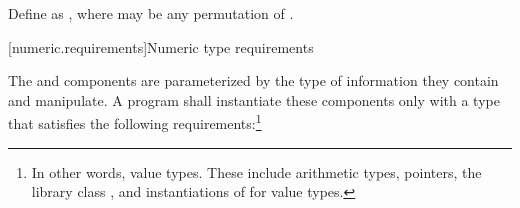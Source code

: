 %
\pnum
Define  as
,
where
 may be any permutation of .

[numeric.requirements]{Numeric type requirements}

\pnum
The
and
components are parameterized by the type of information they contain and manipulate.
A \Cpp program shall instantiate these components only with a type
that satisfies the
following requirements:\footnote{In other words, value types.
These include arithmetic types,
pointers, the library class
,
and instantiations of
for value types.}

